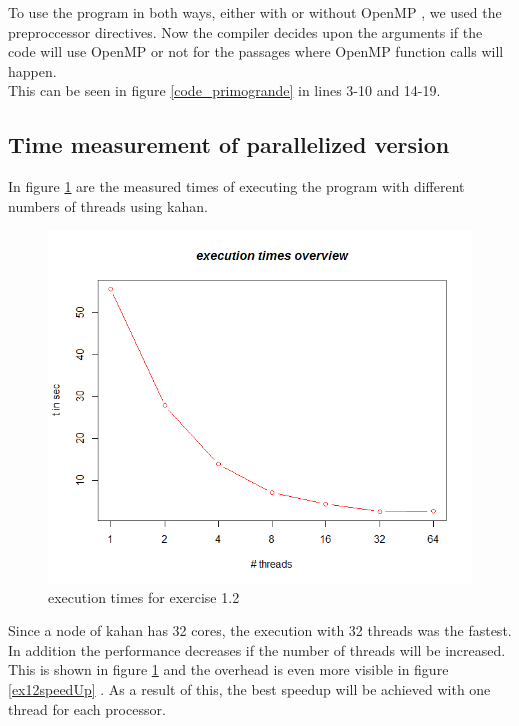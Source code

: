 \documentclass[11pt,a4paper]{article}
\begin{document}
To use the program in both ways, either with or without OpenMP , we used the preproccessor directives. Now the compiler decides upon the arguments if the code will use OpenMP or not for the passages where OpenMP function calls will happen.\\

This can be seen in figure \ref{code_primogrande} in lines 3-10 and 14-19.

\pagebreak
\subsection{Time measurement of parallelized version}

In figure \ref{ex12execution} are the measured times of executing the program with different numbers of threads using kahan.\\

\begin{figure}[h]
\centering
  \includegraphics[scale=0.35]{statistics/Ex12ResultGraph.png}
	\caption{execution times for exercise 1.2}
	\label{ex12execution}
\end{figure}


Since a node of kahan has 32 cores, the execution with 32 threads was the fastest. In addition the performance decreases if the number of threads will be increased. This is shown in figure \ref{ex12execution} and the overhead is even more visible in figure \ref{ex12speedUp} .
As a result of this, the best speedup will be achieved with one thread for each processor.
\end{document}
